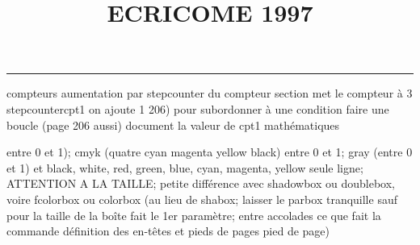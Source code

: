 \documentclass[11pt]{article}%
\title{\bf \vspace{-2cm} ECRICOME 1997} %
\author{} %
\date{} %
\renewcommand{\headrulewidth}{0pt}%
\renewcommand{\footrulewidth}{0.4pt}%
\begin{document}
\maketitle %
\vspace{-1.4cm}\hrule %
\thispagestyle{fancy}

\vspace*{.2cm}



compteurs%
aumentation par stepcounter du compteur section%
met le compteur à 3%
stepcounter{cpt1} on ajoute 1%
206) pour subordonner à une condition %
faire une boucle (page 206 aussi) %
document la valeur de cpt1 
mathématiques\newcommand{\ch}{\operatorname{ch}} 
\newcommand{\sh}{\operatorname{sh}}
\renewcommand{\tanh}{\operatorname{th}}
\renewcommand{\sinh}{\operatorname{sh}}
\renewcommand{\cosh}{\operatorname{ch}}
\newcommand{\argsh}{\operatorname{argsh}}
\newcommand{\argch}{\operatorname{argch}}
\newcommand{\argth}{\operatorname{argth}}
\newcommand{\Id}{\operatorname{Id}}
\renewcommand{\leq}{\leq}
\renewcommand{\geq}{\geq }

\newcommand{\dlim}{\lim}
\newcommand{\dsum}{\sum}
\newcommand{\dint}{\int}
\newcommand{\dprod}{\prod}



entre 0 et 1); cmyk (quatre cyan magenta yellow black) entre 0 et 1;
gray (entre 0 et 1) et black, white, red, green, blue, cyan, magenta,
yellow%
seule ligne; ATTENTION A LA TAILLE; petite différence avec shadowbox ou
doublebox, voire fcolorbox ou colorbox (au lieu de shabox; laisser le
parbox tranquille sauf pour la taille de la boîte
\newcommand{\Tbox}[1]{\begin{center} \shabox{\parbox{0.6
\linewidth}{#1}} \end{center}} %
fait le 1er paramètre; entre accolades ce que fait la commande
définition des en-têtes et pieds de pages\pagestyle{fancy}
\chead{}
\rfoot[ \ \thepage]{\thepage}
\cfoot{}
\lfoot{}
\thispagestyle{fancy} %
pied de page)\renewcommand{\footrulewidth}{0.4pt}
\renewcommand{\headrulewidth}{0.4pt}
\end{document}
